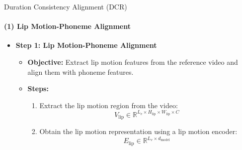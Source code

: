 \begin{frame}{Duration Consistency Alignment (DCR)}
\framesubtitle{(1) Lip Motion-Phoneme Alignment}
\begin{itemize}
    \item \textbf{Step 1: Lip Motion-Phoneme Alignment}
    \begin{itemize}
    \item \textbf{Objective:} Extract lip motion features from the reference video and align them with phoneme features.
    \item \textbf{Steps:}
    \begin{enumerate}
        \item Extract the lip motion region from the video:
        \begin{equation}
            V_{\text{lip}} \in \mathbb{R}^{L_v \times H_{\text{lip}} \times W_{\text{lip}} \times C}
        \end{equation}
        \item Obtain the lip motion representation using a lip motion encoder:
        \begin{equation}
            E_{\text{lip}} \in \mathbb{R}^{L_v \times d_{\text{model}}}
        \end{equation}
    \end{enumerate}
\end{itemize}
\end{itemize}

\end{frame}


